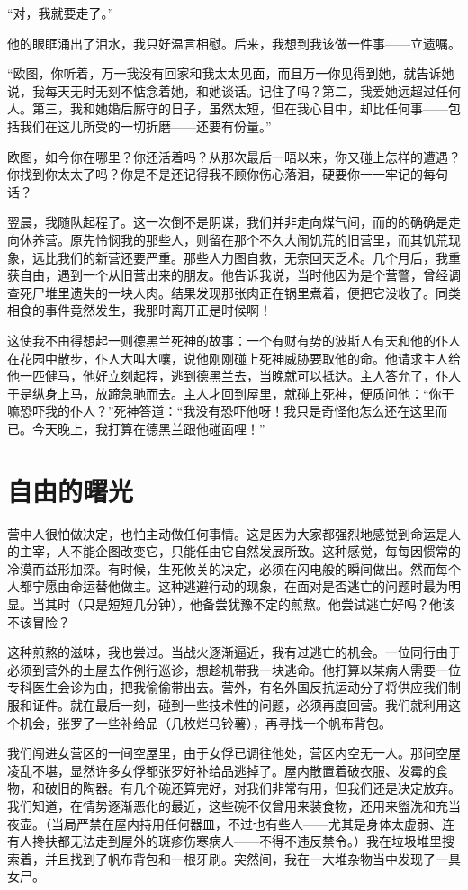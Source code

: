 \documentclass[11pt,oneside]{book}
\begin{document}
\begin{common-format}
“对，我就要走了。”

他的眼眶涌出了泪水，我只好温言相慰。后来，我想到我该做一件事——立遗嘱。

“欧图，你听着，万一我没有回家和我太太见面，而且万一你见得到她，就告诉她说，我每天无时无刻不惦念着她，和她谈话。记住了吗？第二，我爱她远超过任何人。第三，我和她婚后厮守的日子，虽然太短，但在我心目中，却比任何事——包括我们在这儿所受的一切折磨——还要有份量。”

欧图，如今你在哪里？你还活着吗？从那次最后一晤以来，你又碰上怎样的遭遇？你找到你太太了吗？你是不是还记得我不顾你伤心落泪，硬要你一一牢记的每句话？

翌晨，我随队起程了。这一次倒不是阴谋，我们并非走向煤气间，而的的确确是走向休养营。原先怜悯我的那些人，则留在那个不久大闹饥荒的旧营里，而其饥荒现象，远比我们的新营还要严重。那些人力图自救，无奈回天乏术。几个月后，我重获自由，遇到一个从旧营出来的朋友。他告诉我说，当时他因为是个营警，曾经调查死尸堆里遗失的一块人肉。结果发现那张肉正在锅里煮着，便把它没收了。同类相食的事件竟然发生，我那时离开正是时候啊！

这使我不由得想起一则德黑兰死神的故事：一个有财有势的波斯人有天和他的仆人在花园中散步，仆人大叫大嚷，说他刚刚碰上死神威胁要取他的命。他请求主人给他一匹健马，他好立刻起程，逃到德黑兰去，当晚就可以抵达。主人答允了，仆人于是纵身上马，放蹄急驰而去。主人才回到屋里，就碰上死神，便质问他：“你干嘛恐吓我的仆人？”死神答道：“我没有恐吓他呀！我只是奇怪他怎么还在这里而已。今天晚上，我打算在德黑兰跟他碰面哩！”


\section{自由的曙光}
营中人很怕做决定，也怕主动做任何事情。这是因为大家都强烈地感觉到命运是人的主宰，人不能企图改变它，只能任由它自然发展所致。这种感觉，每每因惯常的冷漠而益形加深。有时候，生死攸关的决定，必须在闪电般的瞬间做出。然而每个人都宁愿由命运替他做主。这种逃避行动的现象，在面对是否逃亡的问题时最为明显。当其时（只是短短几分钟），他备尝犹豫不定的煎熬。他尝试逃亡好吗？他该不该冒险？

这种煎熬的滋味，我也尝过。当战火逐渐逼近，我有过逃亡的机会。一位同行由于必须到营外的土屋去作例行巡诊，想趁机带我一块逃命。他打算以某病人需要一位专科医生会诊为由，把我偷偷带出去。营外，有名外国反抗运动分子将供应我们制服和证件。就在最后一刻，碰到一些技术性的问题，必须再度回营。我们就利用这个机会，张罗了一些补给品（几枚烂马铃薯），再寻找一个帆布背包。

我们闯进女营区的一间空屋里，由于女俘已调往他处，营区内空无一人。那间空屋凌乱不堪，显然许多女俘都张罗好补给品逃掉了。屋内散置着破衣服、发霉的食物，和破旧的陶器。有几个碗还算完好，对我们非常有用，但我们还是决定放弃。我们知道，在情势逐渐恶化的最近，这些碗不仅曾用来装食物，还用来盥洗和充当夜壶。（当局严禁在屋内持用任何器皿，不过也有些人——尤其是身体太虚弱、连有人搀扶都无法走到屋外的斑疹伤寒病人——不得不违反禁令。）我在垃圾堆里搜索着，并且找到了帆布背包和一根牙刷。突然间，我在一大堆杂物当中发现了一具女尸。


\end{common-format}
\end{document}
